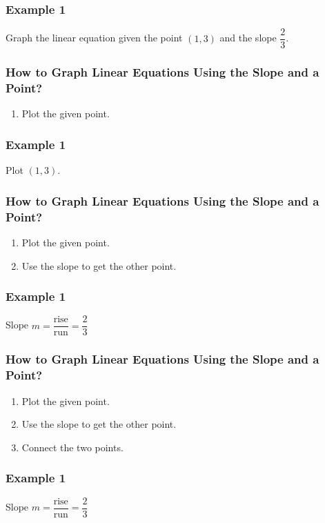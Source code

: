 \documentclass[14pt]{beamer}
\begin{document}
    \begin{frame}
    	\frametitle{Example 1}
    	Graph the linear equation given the point $ (1, 3) $ and the slope $ \dfrac{2}{3} $.
    \end{frame} 

    \begin{frame}
    	\frametitle{How to Graph Linear Equations Using the Slope and a Point?}
    	\begin{enumerate}  
    		\item Plot the given point.
    	\end{enumerate} 
    \end{frame} 

    \begin{frame}
    	\frametitle{Example 1}
    	Plot $ (1, 3) $.
    \end{frame}

    \begin{frame}
    	\frametitle{How to Graph Linear Equations Using the Slope and a Point?}
    	\begin{enumerate}  
    		\item Plot the given point.
    		\item Use the slope to get the other point.
    	\end{enumerate} 
    \end{frame} 

    \begin{frame}
    	\frametitle{Example 1}
    	Slope $m = \dfrac{\text{rise}}{\text{run}} = \dfrac{2}{3} $
    \end{frame}

    \begin{frame}
    	\frametitle{How to Graph Linear Equations Using the Slope and a Point?}
    	\begin{enumerate}  
    		\item Plot the given point.
    		\item Use the slope to get the other point.
    		\item Connect the two points.
    	\end{enumerate} 
    \end{frame} 

    \begin{frame}
    	\frametitle{Example 1}
    	Slope $m = \dfrac{\text{rise}}{\text{run}} = \dfrac{2}{3} $
    \end{frame}
 
\end{document}
